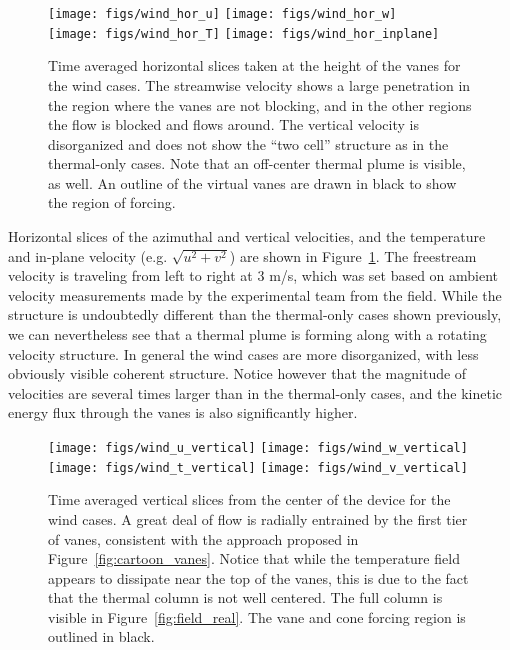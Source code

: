%
%
\begin{figure}[htb]

  \centering
  \texttt{[image: figs/wind\_hor\_u]}
 \hfill
  \texttt{[image: figs/wind\_hor\_w]}
 \\
  \centering
  \texttt{[image: figs/wind\_hor\_T]}
 \hfill
  \texttt{[image: figs/wind\_hor\_inplane]}
 \caption{Time averaged horizontal slices taken at the height of the
 vanes for the wind cases. The streamwise velocity shows a large
 penetration in the region where the vanes are not blocking, and in the
 other regions the flow is blocked and flows around. The vertical
 velocity is disorganized and does not show the ``two cell'' structure
 as in the thermal-only cases.  Note that an off-center thermal plume is
 visible, as well. An outline of the virtual vanes are drawn in black to
 show the region of forcing.}  
 \label{fig:wind-hor}
\end{figure}


Horizontal slices of the azimuthal and vertical velocities, and the 
temperature and in-plane velocity (e.g. $\sqrt{u^2 + v^2}$) are shown in
Figure~\ref{fig:wind-hor}. The freestream velocity is traveling from
left to right at 3 m/s, which was set based on ambient velocity
measurements made by the experimental team from the field. While the
structure is undoubtedly different than the thermal-only cases shown
previously, we can nevertheless see that a thermal plume is forming
along with a rotating velocity structure. In general the wind cases are
more disorganized, with less obviously visible coherent
structure. Notice however that the magnitude of velocities are several
times larger than in the thermal-only cases, and the kinetic energy flux
through the vanes is also significantly higher.    

%
%

\begin{figure}[htb]
  \centering
  \texttt{[image: figs/wind\_u\_vertical]}
  \hfill
  \texttt{[image: figs/wind\_w\_vertical]}
  \\
  \centering
  \texttt{[image: figs/wind\_t\_vertical]}
  \hfill
  \texttt{[image: figs/wind\_v\_vertical]}
  \\
 \caption{Time averaged vertical slices from the center of the device
 for the wind cases. A great deal of flow is radially entrained by the
 first tier of vanes, consistent with the approach proposed in
 Figure~\ref{fig:cartoon_vanes}. Notice that while the temperature field
  appears to dissipate near the top of the vanes, this is due to the
 fact that the thermal column is not well centered. The full column is
 visible in Figure~\ref{fig:field_real}. The vane and cone forcing region is
 outlined in black.}
 \label{fig:wind-ver}
\end{figure}

